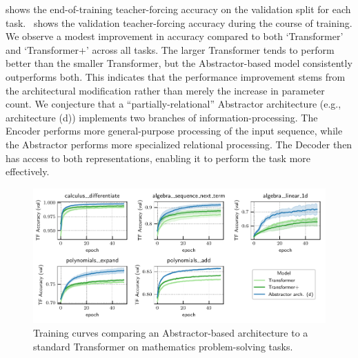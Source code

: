  shows the end-of-training teacher-forcing accuracy on the validation split for each task.~ shows the validation teacher-forcing accuracy during the course of training. We observe a modest improvement in accuracy compared to both `Transformer' and `Transformer+' across all tasks. The larger Transformer tends to perform better than the smaller Transformer, but the Abstractor-based model consistently outperforms both. This indicates that the performance improvement stems from the architectural modification rather than merely the increase in parameter count. We conjecture that a ``partially-relational'' Abstractor architecture (e.g., architecture (d)) implements two branches of information-processing. The Encoder performs more general-purpose processing of the input sequence, while the Abstractor performs more specialized relational processing. The Decoder then has access to both representations, enabling it to perform the task more effectively.

\begin{figure}[t]
    \centering
    \includegraphics[width=\textwidth]{figures/experiments/math_training_curves.pdf}
    \caption{Training curves comparing an Abstractor-based architecture to a standard Transformer on mathematics problem-solving tasks.}\label{fig:math_training_curves}
\end{figure}